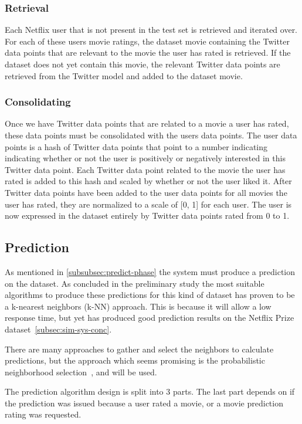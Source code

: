 \subsubsection{Retrieval}
	Each Netflix user that is not present in the test set is retrieved and iterated over. For each of these users movie ratings, the dataset movie containing the Twitter data points that are relevant to the movie the user has rated is retrieved. If the dataset does not yet contain this movie, the relevant Twitter data points are retrieved from the Twitter model and added to the dataset movie.

\subsubsection{Consolidating}
	Once we have Twitter data points that are related to a movie a user has rated, these data points must be consolidated with the users data points. The user data points is a hash of Twitter data points that point to a number indicating indicating whether or not the user is positively or negatively interested in this Twitter data point. Each Twitter data point related to the movie the user has rated is added to this hash and scaled by whether or not the user liked it. After Twitter data points have been added to the user data points for all movies the user has rated, they are normalized to a scale of [0, 1] for each user. The user is now expressed in the dataset entirely by Twitter data points rated from 0 to 1.

\subsection{Prediction}\label{algorithm-design:prediction}
As mentioned in \ref{subsubsec:predict-phase} the system must produce a prediction on the dataset. As concluded in the preliminary study the most suitable algorithms to produce these predictions for this kind of dataset has proven to be a k-nearest neighbors (k-NN) approach. This is because it will allow a low response time, but yet has produced good prediction results on the Netflix Prize dataset~\ref{subsec:sim-sys-conc}.

There are many approaches to gather and select the neighbors to calculate predictions, but the approach which seems promising is the probabilistic neighborhood selection~\cite{probcobfilter}, and will be used.

The prediction algorithm design is split into 3 parts. The last part depends on if the prediction was issued because a user rated a movie, or a movie prediction rating was requested.

